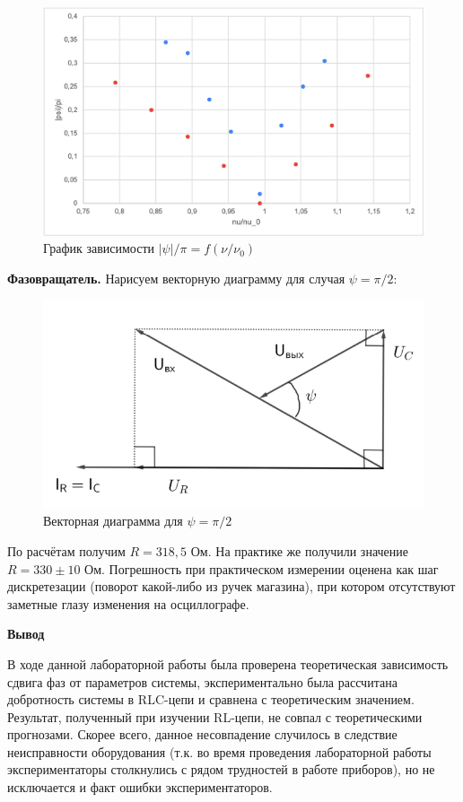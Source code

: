 \documentclass[a4paper, 12pt]{article}
\begin{document}
    \begin{figure}[ht]
        \centering
        \includegraphics[width=0.9\linewidth]{images/RLC-graph.png}
        \caption{График зависимости $|\psi| / \pi = f(\nu / \nu_0)$}
        \label{pic3}
    \end{figure}
    
    \newpage
    
    {\bf Фазовращатель.} Нарисуем векторную диаграмму для случая $\psi = \pi / 2$:
    
    \begin{figure}[ht]
        \centering
        \includegraphics{images/phase.png}
        \caption{Векторная диаграмма для $\psi = \pi / 2$}
    \end{figure}
    
    По расчётам получим $R = 318,5 \text{ Ом}$. На практике же получили значение $R = 330 \pm 10 \text{ Ом}$. Погрешность при практическом измерении оценена как шаг дискретезации (поворот какой-либо из ручек магазина), при котором отсутствуют заметные глазу изменения на осциллографе.
    
    \begin{flushleft}
        {\Large {\bf Вывод}}
    \end{flushleft}
    
    В ходе данной лабораторной работы была проверена теоретическая зависимость сдвига фаз от параметров системы, экспериментально была рассчитана добротность системы в RLC-цепи и сравнена с теоретическим значением. Результат, полученный при изучении RL-цепи, не совпал с теоретическими прогнозами. Скорее всего, данное несовпадение случилось в следствие неисправности оборудования (т.к. во время проведения лабораторной работы экспериментаторы столкнулись с рядом трудностей в работе приборов), но не исключается и факт ошибки экспериментаторов.
    
\end{document}
